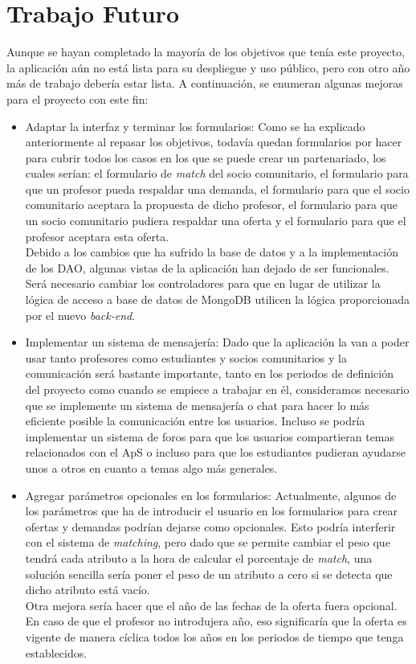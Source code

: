 \documentclass[11pt]{book}
\begin{document}
\section{Trabajo Futuro}
Aunque se hayan completado la mayoría de los objetivos que tenía este proyecto, la aplicación aún no está lista para su despliegue y uso público, pero con otro año más de trabajo debería estar lista. A continuación, se enumeran algunas mejoras para el proyecto con este fin:
\begin{itemize}
	\item Adaptar la interfaz y terminar los formularios: Como se ha explicado anteriormente al repasar los objetivos, todavía quedan formularios por hacer para cubrir todos los casos en los que se puede crear un partenariado, los cuales serían: el formulario de \emph{match} del socio comunitario, el formulario para que un profesor pueda respaldar una demanda, el formulario para que el socio comunitario aceptara la propuesta de dicho profesor, el formulario para que un socio comunitario pudiera respaldar una oferta y el formulario para que el profesor aceptara esta oferta.\\
	Debido a los cambios que ha sufrido la base de datos y a la implementación de los DAO, algunas vistas de la aplicación han dejado de ser funcionales. Será necesario cambiar los controladores para que en lugar de utilizar la lógica de acceso a base de datos de MongoDB utilicen la lógica proporcionada por el nuevo \emph{back-end}.
	\item Implementar un sistema de mensajería: Dado que la aplicación la van a poder usar tanto profesores como estudiantes y socios comunitarios y la comunicación será bastante importante, tanto en los periodos de definición del proyecto como cuando se empiece a trabajar en él, consideramos necesario que se implemente un sistema de mensajería o chat para hacer lo más eficiente posible la comunicación entre los usuarios. Incluso se podría implementar un sistema de foros para que los usuarios compartieran temas relacionados con el ApS o incluso para que los estudiantes pudieran ayudarse unos a otros en cuanto a temas algo más generales.
	\item Agregar parámetros opcionales en los formularios: Actualmente, algunos de los parámetros que ha de introducir el usuario en los formularios para crear ofertas y demandas podrían dejarse como opcionales. Esto podría interferir con el sistema de \emph{matching}, pero dado que se permite cambiar el peso que tendrá cada atributo a la hora de calcular el porcentaje de \emph{match}, una solución sencilla sería poner el peso de un atributo a cero si se detecta que dicho atributo está vacío.\\
	Otra mejora sería hacer que el año de las fechas de la oferta fuera opcional. En caso de que el profesor no introdujera año, eso significaría que la oferta es vigente de manera cíclica todos los años en los periodos de tiempo que tenga establecidos.
\end{itemize}
\end{document}
